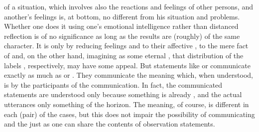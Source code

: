  of a situation, which involves also the reactions and feelings of
other persons, and  another's feelings is, at bottom, no different
from  his situation and problems. Whether one does it using one's
emotional intelligence rather than distanced reflection is of no significance as
long as the results are (roughly) of the same character. It is only by reducing
feelings and  to their affective , to the mere fact of
 and, on the other hand, imagining 
as some eternal , that distribution of the  labels
, respectively,  may have some appeal. But
statements like  or  communicate
exactly as much as  or . They
communicate the meaning which, when understood, is  by the
participants of the communication. In fact, the communicated statements are
understood only because something is already , and the actual
utterances only  something of the  horizon. The
meaning, of course, is different in each (pair) of the cases, but this does not
impair the possibility of communicating and  the  just as
one can {share} the  contents of observation statements.

